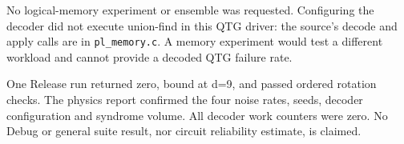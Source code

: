 No logical-memory experiment or ensemble was requested. Configuring the
decoder did not execute union-find in this QTG driver: the source's decode
and apply calls are in \texttt{pl\_memory.c}. A memory experiment would test
a different workload and cannot provide a decoded QTG failure rate.

One Release run returned zero, bound at d=9, and passed ordered rotation
checks. The physics report confirmed the four noise rates, seeds, decoder
configuration and syndrome volume. All decoder work counters were zero.
No Debug or general suite result, nor circuit reliability estimate, is claimed.
